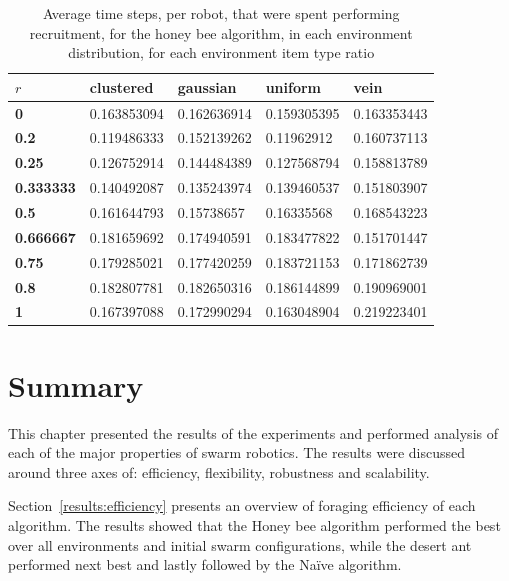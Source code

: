 \begin{table}[]
\centering
\caption{Average time steps, per robot, that were spent performing recruitment, for the honey bee algorithm, in each environment distribution, for each environment item type ratio}
\label{averagetimerecruitment}
\begin{tabular}{@{}lllll@{}}
\toprule
$r$            & \textbf{clustered} & \textbf{gaussian} & \textbf{uniform} & \textbf{vein} \\ \midrule
\textbf{0}        & 0.163853094        & 0.162636914       & 0.159305395      & 0.163353443   \\
\textbf{0.2}      & 0.119486333        & 0.152139262       & 0.11962912       & 0.160737113   \\
\textbf{0.25}     & 0.126752914        & 0.144484389       & 0.127568794      & 0.158813789   \\
\textbf{0.333333} & 0.140492087        & 0.135243974       & 0.139460537      & 0.151803907   \\
\textbf{0.5}      & 0.161644793        & 0.15738657        & 0.16335568       & 0.168543223   \\
\textbf{0.666667} & 0.181659692        & 0.174940591       & 0.183477822      & 0.151701447   \\
\textbf{0.75}     & 0.179285021        & 0.177420259       & 0.183721153      & 0.171862739   \\
\textbf{0.8}      & 0.182807781        & 0.182650316       & 0.186144899      & 0.190969001   \\
\textbf{1}        & 0.167397088        & 0.172990294       & 0.163048904      & 0.219223401   \\ \bottomrule
\end{tabular}
\end{table}

\section{Summary}
\label{results:summary}

This chapter presented the results of the experiments and performed analysis of each of the major properties of swarm robotics. The results were discussed around three axes of: efficiency, flexibility, robustness and scalability. 

Section~\ref{results:efficiency} presents an overview of foraging efficiency of each algorithm. The results showed that the Honey bee algorithm performed the best over all environments and initial swarm configurations, while the desert ant performed next best and lastly followed by the Na\"ive algorithm.

